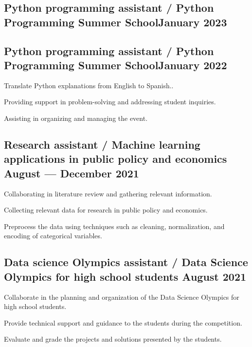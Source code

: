 \subsection{{Python programming assistant / Python Programming Summer School\hfill January 2023}}
\subsection{{Python programming assistant / Python Programming Summer School\hfill January 2022}}
\begin{zitemize}
\item Translate Python explanations from English to Spanish..
\item Providing support in problem-solving and addressing student inquiries.
\item Assisting in organizing and managing the event.

\end{zitemize}

\subsection{{Research assistant / Machine learning applications in public policy and economics \hfill August --- December 2021}}
\begin{zitemize}
\item Collaborating in literature review and gathering relevant information.
\item Collecting relevant data for research in public policy and economics.
\item Preprocess the data using techniques such as cleaning, normalization, and encoding of categorical variables.

\end{zitemize}

\subsection{{Data science Olympics assistant / Data Science Olympics for high school students \hfill August 2021}}
\begin{zitemize}
\item Collaborate in the planning and organization of the Data Science Olympics for high school students.
\item Provide technical support and guidance to the students during the competition.
\item Evaluate and grade the projects and solutions presented by the students.

\end{zitemize}
